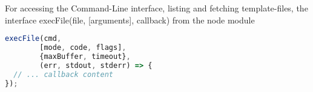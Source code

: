 For accessing the Command-Line interface, listing and fetching template-files, the interface execFile(file, [arguments], callback) from the node module


\begin{lstlisting}[language=javascript]
execFile(cmd,
        [mode, code, flags],
        {maxBuffer, timeout},
        (err, stdout, stderr) => {
  // ... callback content
});
\end{lstlisting}
